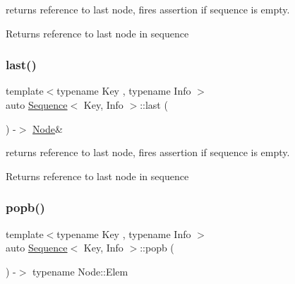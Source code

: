 returns reference to last node, fires assertion if sequence is empty. 

\begin{DoxyReturn}{Returns}
reference to last node in sequence 
\end{DoxyReturn}
\mbox{\label{structSequence_a6fe042cd5200902a88c92510a6f37b19}} 
\subsubsection{\texorpdfstring{last()}{last()}\hspace{0.1cm}{\footnotesize\ttfamily [2/2]}}
{\footnotesize\ttfamily template$<$typename Key , typename Info $>$ \\
auto \mbox{\hyperlink{structSequence}{Sequence}}$<$ Key, Info $>$\+::last (\begin{DoxyParamCaption}{ }\end{DoxyParamCaption}) -\/$>$ \mbox{\hyperlink{structSequence_1_1Node}{Node}}\& \hspace{0.3cm}{\ttfamily [inline]}}



returns reference to last node, fires assertion if sequence is empty. 

\begin{DoxyReturn}{Returns}
reference to last node in sequence 
\end{DoxyReturn}
\mbox{\label{structSequence_a7821f89dc1b96a00f9f77e7a64abdb89}} 
\subsubsection{\texorpdfstring{popb()}{popb()}}
{\footnotesize\ttfamily template$<$typename Key , typename Info $>$ \\
auto \mbox{\hyperlink{structSequence}{Sequence}}$<$ Key, Info $>$\+::popb (\begin{DoxyParamCaption}{ }\end{DoxyParamCaption}) -\/$>$ typename Node\+::\+Elem \hspace{0.3cm}{\ttfamily [inline]}}



